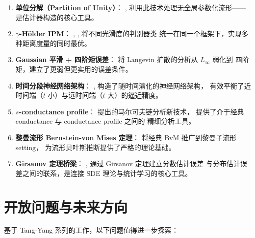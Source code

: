 \documentclass[12pt]{amsbook}
\theoremstyle{plain}
\begin{document}
\begin{enumerate}
    \item \textbf{单位分解（Partition of Unity）}：
          \citep{tang2022minimax}, \citep{tang2023lowdim} 利用此技术处理无全局参数化流形——
          是估计器构造的核心工具。

    \item \textbf{$\gamma$-Hölder IPM}：
          \citep{tang2022minimax}, \citep{tang2023twosample}, \citep{tang2025regression} 将不同光滑度的判别器类
          统一在同一个框架下，实现多种距离度量的同时最优。

    \item \textbf{Gaussian 平滑 + 四阶矩误差}：
          \citep{tang2024diffusion} 将 Langevin 扩散的分析从 $L_\infty$ 弱化到
          四阶矩，建立了更弱但更实用的误差条件。

    \item \textbf{时间分段神经网络架构}：
          \citep{tang2024diffusion}, \citep{tang2025conditional} 构造了随时间演化的神经网络架构，
          有效平衡了近时间端（$t$ 小）与远时间端（$t$ 大）的逼近精度。

    \item \textbf{$s$-conductance profile}：
          \citep{tang2024mala} 提出的马尔可夫链分析新技术，
          提供了介于经典 conductance 与 conductance profile 之间的
          精细分析工具。

    \item \textbf{黎曼流形 Bernstein-von Mises 定理}：
          \citep{tang2023robust} 将经典 BvM 推广到黎曼子流形 setting，
          为流形贝叶斯推断提供了严格的理论基础。

    \item \textbf{Girsanov 定理桥梁}：
          \citep{tang2024diffusion}, \citep{tang2025conditional} 通过 Girsanov 定理建立分数估计误差
          与分布估计误差之间的联系，是连接 SDE 理论与统计学习的核心工具。
\end{enumerate}

\section{开放问题与未来方向}\label{sec:tang-open}

基于 Tang-Yang 系列的工作，以下问题值得进一步探索：
\end{document}
